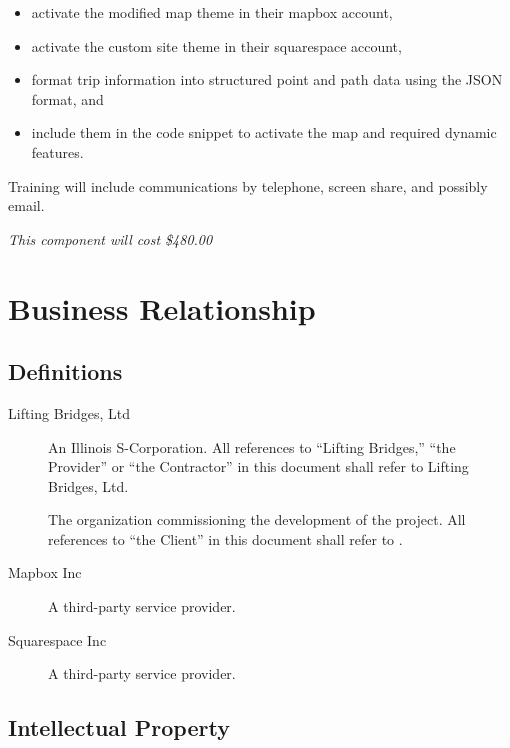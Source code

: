 \documentclass[11pt]{article}
\begin{document}
\begin{itemize}

\item activate the modified map theme in their mapbox account,
\item activate the custom site theme in their squarespace account,
\item format trip information into structured point and path data using the JSON format, and
\item include them in the code snippet to activate the map and required dynamic features.

\end{itemize}

Training will include communications by telephone, screen share, and
possibly email.

\emph{This component will cost \$480.00}

\section{Business Relationship}

\subsection{Definitions}
\label{definitions}

\begin{description}

\item[Lifting Bridges, Ltd] An Illinois S-Corporation. All references
  to ``Lifting Bridges,'' ``the Provider'' or ``the Contractor'' in
  this document shall refer to Lifting Bridges, Ltd.

\item[\theclient] The organization commissioning the development of
  the project. All references to ``the Client'' in this document shall
  refer to \theclient.

\item[Mapbox Inc] A third-party service provider.

\item[Squarespace Inc] A third-party service provider.

\end{description}

\subsection{Intellectual Property}
\end{document}
